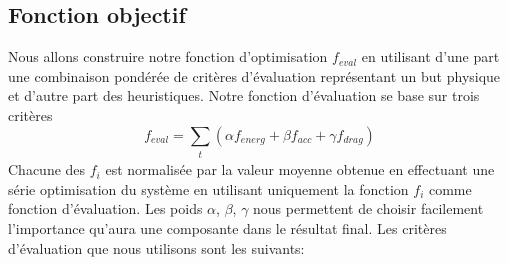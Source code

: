 \documentclass[runningheads,a4paper]{llncs}
\begin{document}
\subsection{Fonction objectif}
%
Nous allons construire notre fonction d'optimisation $f_{eval}$ en utilisant d'une part une combinaison pondérée de critères d'évaluation représentant un but physique et d'autre part des heuristiques. Notre fonction d'évaluation se base sur trois critères 
\begin{equation}
f_{eval}=\sum_{\substack{t}} (\alpha f_{energ} + \beta f_{acc} + \gamma f_{drag})
\label{eq:simple_objective}
\end{equation}
Chacune des $f_i$ est normalisée par la valeur moyenne obtenue en effectuant une série optimisation du système en utilisant uniquement la fonction $f_i$ comme fonction d'évaluation. Les poids $\alpha$, $\beta$, $\gamma$ nous permettent de choisir facilement l'importance qu'aura une composante dans le résultat final. Les critères d'évaluation que nous utilisons sont les suivants:
\end{document}
